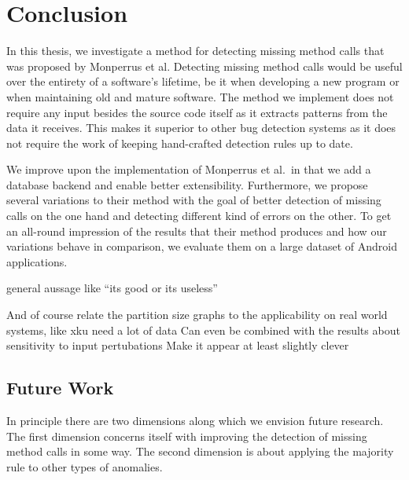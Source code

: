 \chapter{Conclusion}\label{ch:concl}

In this thesis, we investigate a method for detecting missing method calls that was proposed by Monperrus et al.
Detecting missing method calls would be useful over the entirety of a software's lifetime, be it when developing a new program or when maintaining old and mature software.
The method we implement does not require any input besides the source code itself as it extracts patterns from the data it receives.
This makes it superior to other bug detection systems as it does not require the work of keeping hand-crafted detection rules up to date.

We improve upon the implementation of Monperrus et al.\ in that we add a database backend and enable better extensibility.
Furthermore, we propose several variations to their method with the goal of better detection of missing calls on the one hand and detecting different kind of errors on the other.
To get an all-round impression of the results that their method produces and how our variations behave in comparison, we evaluate them on a large dataset of Android applications. 

general aussage like ``its good or its useless''

	And of course relate the partition size graphs to the applicability on real world systems, like xku need a lot of data
	Can even be combined with the results about sensitivity to input pertubations
	Make it appear at least slightly clever


\section{Future Work}

In principle there are two dimensions along which we envision future research.
The first dimension concerns itself with improving the detection of missing method calls in some way.
The second dimension is about applying the majority rule to other types of anomalies.

